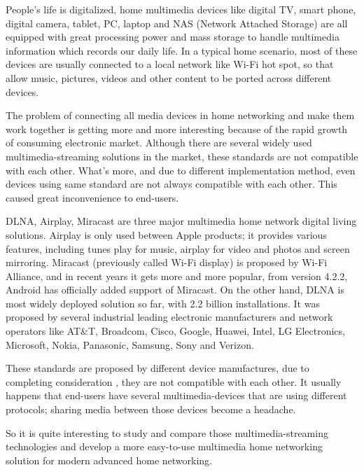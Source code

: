 
People's life is digitalized, home multimedia devices like digital TV, smart phone, 
digital camera, tablet, PC, laptop and NAS (Network Attached Storage) are all equipped
 with great processing power and mass storage to handle multimedia information which 
 records our daily life. In a typical home scenario, most of these devices are usually 
 connected to a local network like Wi-Fi hot spot, so that allow music, pictures, videos 
 and other content to be ported across different devices. 

The problem of connecting all media devices in home networking and make them work together 
is getting more and more interesting because of the rapid growth of consuming electronic 
market. Although there are several widely used multimedia-streaming solutions in the market, 
these standards are not compatible with each other. What's more, and due to different 
implementation method, even devices using same standard are not always compatible with 
each other. This caused great inconvenience to end-users.

DLNA, Airplay, Miracast are three major multimedia home network digital living solutions. 
Airplay is only used between Apple products; it provides various features, including tunes 
play for music, airplay for video and photos and screen mirroring. Miracast (previously 
called Wi-Fi display) is proposed by Wi-Fi Alliance, and in recent years it gets more and 
more popular, from version 4.2.2, Android has officially added support of Miracast. On the 
other hand, DLNA is most widely deployed solution so far, with 2.2 billion installations. 
It was proposed by several industrial leading electronic manufacturers and network operators 
like AT$\&$T, Broadcom, Cisco, Google, Huawei, Intel, LG Electronics, Microsoft, Nokia, 
Panasonic, Samsung, Sony and Verizon.

These standards are proposed by different device manufactures, due to completing consideration
, they are not compatible with each other. It usually happens that end-users have several 
multimedia-devices that are using different protocols; sharing media between those devices 
become a headache.

So it is quite interesting to study and compare those multimedia-streaming technologies and 
develop a more easy-to-use multimedia home networking solution for modern advanced home 
networking.
